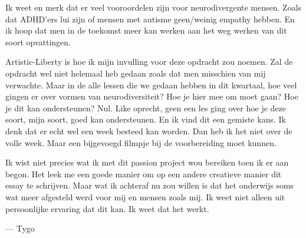 \documentclass{article}
\begin{document}
        Ik weet en merk dat er veel vooroordelen zijn voor neurodivergente mensen. Zoals dat ADHD'ers lui zijn of mensen met autisme geen/weinig empathy hebben. En ik hoop dat men in de toekomst meer kan werken aan het weg werken van dit soort opvattingen. 
        
        Artistic-Liberty is hoe ik mijn invulling voor deze opdracht zou noemen. Zal de opdracht wel niet helemaal heb gedaan zoals dat men misschien van mij verwachte. Maar in de alle lessen die we gedaan hebben in dit kwartaal, hoe veel gingen er over vormen van neurodiversiteit? Hoe je hier mee om moet gaan? Hoe je dit kan ondersteunen? Nul. Like oprecht, geen een les ging over hoe je deze soort, mijn soort, goed kan ondersteunen. En ik vind dit een gemiste kans. Ik denk dat er echt wel een week besteed kan worden. Dan heb ik het niet over de volle week. Maar een bijgevoegd filmpje bij de voorbereiding moet kunnen.
        
        Ik wist niet precies wat ik met dit passion project wou bereiken toen ik er aan begon. Het leek me een goede manier om op een andere creatieve manier dit essay te schrijven. Maar wat ik achteraf nu zou willen is dat het onderwijs soms wat meer afgesteld werd voor mij en mensen zoals mij. Ik weet niet alleen uit persoonlijke ervaring dat dit kan. Ik weet  dat het werkt. 
        
        — Tygo
        
    \newpage
    
    
\end{document}
